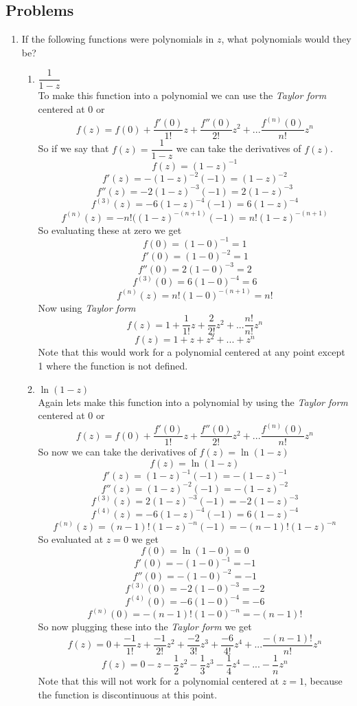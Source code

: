 \documentclass[11pt]{article}
\begin{document}
\subsection*{Problems}

\begin{enumerate}
\item If the following functions were polynomials in $z$, what polynomials would they be?
\begin{enumerate}
\item $\dfrac{1}{1-z}$\\
To make this function into a polynomial we can use the \emph{Taylor form} centered at 0 or
$$f(z) = f(0) + \frac{f'(0)}{1!}z +\frac{f''(0)}{2!}z^2 + ...\frac{f^{(n)}(0)}{n!}z^n $$
So if we say that $f(z) = \dfrac{1}{1-z}$ we can take the derivatives of $f(z)$.
$$f(z) = (1-z)^{-1}$$
$$f'(z) = -(1-z)^{-2}(-1) = (1-z)^{-2}$$
$$f''(z) = -2(1-z)^{-3}(-1) = 2(1-z)^{-3}$$
$$f^{(3)}(z) = -6(1-z)^{-4}(-1) = 6(1-z)^{-4}$$
$$f^{(n)}(z) = -n!((1-z)^{-(n+1)}(-1) = n!(1-z)^{-(n+1)}$$
So evaluating these at zero we get
$$f(0) = (1-0)^{-1}=1$$
$$f'(0) = (1-0)^{-2}=1$$
$$f''(0) =  2(1-0)^{-3}=2$$
$$f^{(3)}(0) = 6(1-0)^{-4}=6$$
$$f^{(n)}(z) =  n!(1-0)^{-(n+1)} = n!$$
Now using \emph{Taylor form}
$$f(z) = 1 + \frac{1}{1!}z +\frac{2}{2!}z^2 + ...\frac{n!}{n!}z^n $$
$$f(z) = 1 + z + z^2 + ...+z^n $$
Note that this would work for a polynomial centered at any point except 1 where the function is not defined.
\item $\ln(1-z)$\\
Again lets make this function into a polynomial by using the \emph{Taylor form} centered at 0 or
$$f(z) = f(0) + \frac{f'(0)}{1!}z +\frac{f''(0)}{2!}z^2 + ...\frac{f^{(n)}(0)}{n!}z^n $$
So now we can take the derivatives of $f(z) = \ln(1-z)$
$$f(z) = \ln(1-z)$$
$$f'(z) = (1-z)^{-1}(-1) = -(1-z)^{-1}$$
$$f''(z) = (1-z)^{-2}(-1)=-(1-z)^{-2}$$
$$f^{(3)}(z) = 2(1-z)^{-3}(-1)=-2(1-z)^{-3}$$
$$f^{(4)}(z) = -6(1-z)^{-4}(-1)=6(1-z)^{-4}$$
$$f^{(n)}(z) = (n-1)!(1-z)^{-n}(-1)=-(n-1)!(1-z)^{-n}$$
So evaluated at $z=0$ we get
$$f(0) = \ln(1-0)=0$$
$$f'(0) = -(1-0)^{-1}=-1$$
$$f''(0) = -(1-0)^{-2}=-1$$
$$f^{(3)}(0) = -2(1-0)^{-3}=-2$$
$$f^{(4)}(0) = -6(1-0)^{-4}=-6$$
$$f^{(n)}(0) = -(n-1)!(1-0)^{-n}=-(n-1)!$$
So now plugging these into the \emph{Taylor form} we get
$$f(z) = 0 + \frac{-1}{1!}z +\frac{-1}{2!}z^2 + \frac{-2}{3!}z^3 +\frac{-6}{4!}z^4 +...\frac{-(n-1)!}{n!}z^n $$
$$f(z) = 0 - z -\frac{1}{2}z^2 - \frac{1}{3}z^3 -\frac{1}{4}z^4 -...-\frac{1}{n}z^n $$
Note that this will not work for a polynomial centered at $z=1$, because the function is discontinuous at this point.


\end{enumerate}
\end{enumerate}
\end{document}
